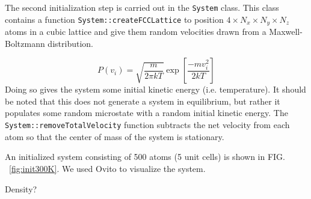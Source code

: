 \documentclass[10pt,showpacs,preprintnumbers,footinbib,amsmath,amssymb,aps,prl,twocolumn,groupedaddress,superscriptaddress,showkeys]{revtex4-1}
\begin{document}
The second initialization step is carried out in the \texttt{System}
class. This class contains a function \texttt{System::createFCCLattice}
to position $4 \times N_x \times N_y \times N_z$ atoms in a cubic lattice
and give them random velocities drawn from a Maxwell-Boltzmann
distribution.

\begin{equation*}
	P(v_i) = \sqrt{\frac{m}{2 \pi k T}} \exp \left [ \frac{-m v_i ^2}{2kT} \right ]
\end{equation*}
Doing so gives the system some
initial kinetic energy (i.e. temperature). It should be noted that this
does not generate a system
in equilibrium, but rather it populates some random microstate with a
random initial kinetic energy. The \texttt{System::removeTotalVelocity}
function subtracts the net velocity from each atom so that the center of
mass of the system is stationary.

An initialized system consisting of 500 atoms (5 unit cells) is shown in FIG.
~\ref{fig:init300K}. We used Ovito \citep{ovito} to visualize the system.

Density?
\end{document}
